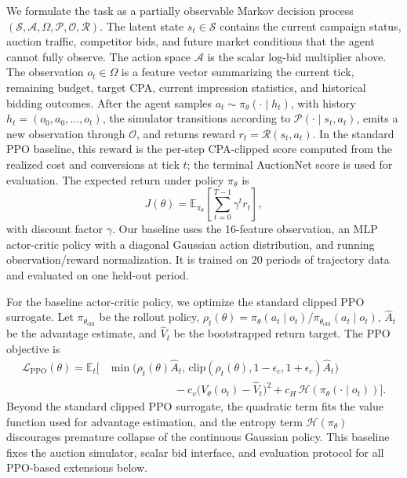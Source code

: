 \documentclass{article}
\begin{document}
We formulate the task as a partially observable Markov decision process
\((\mathcal{S}, \mathcal{A}, \Omega, \mathcal{P}, \mathcal{O},
\mathcal{R})\). The latent state \(s_t \in \mathcal{S}\) contains the
current campaign status, auction traffic, competitor bids, and future market
conditions that the agent cannot fully observe. The action space
\(\mathcal{A}\) is the scalar log-bid multiplier above. The observation
\(o_t \in \Omega\) is a feature vector summarizing the current tick, remaining
budget, target CPA, current impression statistics, and historical bidding
outcomes. After the agent samples \(a_t \sim \pi_\theta(\cdot \mid h_t)\), with
history \(h_t=(o_0,a_0,\ldots,o_t)\), the simulator transitions according to
\(\mathcal{P}(\cdot \mid s_t,a_t)\), emits a new observation through
\(\mathcal{O}\), and returns reward \(r_t=\mathcal{R}(s_t,a_t)\). In the
standard PPO baseline, this reward is the per-step CPA-clipped score computed
from the realized cost and conversions at tick \(t\); the terminal AuctionNet
score is used for evaluation. The expected return under policy \(\pi_\theta\)
is
\[
  J(\theta)=
  \mathbb{E}_{\pi_\theta}\!\left[
    \sum_{t=0}^{T-1} \gamma^t r_t
  \right],
\]
with discount factor \(\gamma\). Our baseline uses the 16-feature observation,
an MLP actor-critic policy with a diagonal Gaussian action distribution, and
running observation/reward normalization. It is trained on 20 periods of
trajectory data and evaluated on one held-out period.

For the baseline actor-critic policy, we optimize the standard clipped PPO
surrogate. Let \(\pi_{\theta_{\mathrm{old}}}\) be the rollout policy,
\(\rho_t(\theta)=\pi_\theta(a_t\mid o_t)/
\pi_{\theta_{\mathrm{old}}}(a_t\mid o_t)\), \(\hat A_t\) be the advantage
estimate, and \(\hat V_t\) be the bootstrapped return target. The PPO objective
is
\begin{equation}
\begin{split}
  \mathcal{L}_{\mathrm{PPO}}(\theta)
  =
  \mathbb{E}_t \Big[
    &\min\!\big(
      \rho_t(\theta)\hat A_t,\,
      \mathrm{clip}(\rho_t(\theta),1-\epsilon_c,1+\epsilon_c)\hat A_t
    \big) \\
    &\qquad\qquad\qquad- c_v\big(V_\theta(o_t)-\hat V_t\big)^2
    + c_H\,\mathcal{H}\!\left(\pi_\theta(\cdot\mid o_t)\right)
  \Big].
\end{split}
\end{equation}
Beyond the standard clipped PPO surrogate, the quadratic term fits the value
function used for advantage estimation, and the entropy term
\(\mathcal{H}(\pi_\theta)\) discourages premature collapse of the continuous
Gaussian policy.
This baseline fixes the auction simulator, scalar bid interface, and evaluation
protocol for all PPO-based extensions below.
\end{document}
